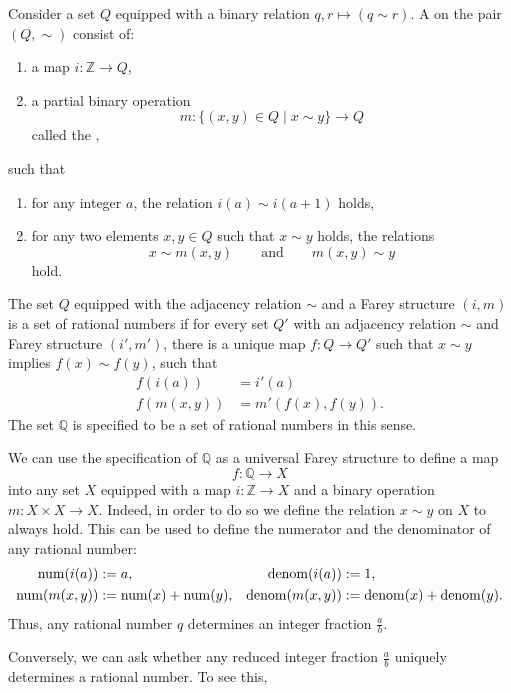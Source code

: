 \begin{definition}
  Consider a set $Q$ equipped with a binary relation $q,r\mapsto (q\sim r)$. A  on the pair $(Q,{\sim})$ consist of:
  \begin{enumerate}
  \item a map $i:\mathbb{Z}\to Q$,
  \item a partial binary operation
    \begin{equation*}
      m:\{(x,y)\in Q\mid x\sim y\} \to Q
    \end{equation*}
    called the ,
  \end{enumerate}
  such that
  \begin{enumerate}
  \item for any integer $a$, the relation $i(a)\sim i(a+1)$ holds,
  \item for any two elements $x,y\in Q$ such that $x\sim y$ holds, the relations
    \begin{equation*}
      x\sim m(x,y)\qquad\text{and}\qquad m(x,y)\sim y
    \end{equation*}
    hold.
  \end{enumerate}
\end{definition}

\begin{definition}
  The set $Q$ equipped with the adjacency relation $\sim$ and a Farey structure $(i,m)$ is a set of rational numbers if for every set $Q'$ with an adjacency relation $\sim$ and Farey structure $(i',m')$, there is a unique map $f:Q\to Q'$ such that $x\sim y$ implies $f(x)\sim f(y)$, such that
  \begin{align*}
    f(i(a)) & = i'(a) \\
    f(m(x,y)) & = m'(f(x),f(y)).
  \end{align*}
  The set $\mathbb{Q}$ is specified to be a set of rational numbers in this sense.
\end{definition}

\begin{example}
  We can use the specification of $\mathbb{Q}$ as a universal Farey structure to define a map
  \begin{equation*}
    f:\mathbb{Q}\to X
  \end{equation*}
  into any set $X$ equipped with a map $i:\mathbb{Z}\to X$ and a binary operation $m:X\times X\to X$. Indeed, in order to do so we define the relation $x\sim y$ on $X$ to always hold. This can be used to define the numerator and the denominator of any rational number:
  \begin{align*}
    \operatorname{num}(i(a)) & := a, & \operatorname{denom}(i(a)) & := 1, \\
    \operatorname{num}(m(x,y)) & := \operatorname{num}(x)+\operatorname{num}(y), & \operatorname{denom}(m(x,y)) & := \operatorname{denom}(x)+\operatorname{denom}(y).
  \end{align*}
  Thus, any rational number $q$ determines an integer fraction $\frac{a}{b}$.

  Conversely, we can ask whether any reduced integer fraction $\frac{a}{b}$ uniquely determines a rational number. To see this, 
\end{example}

